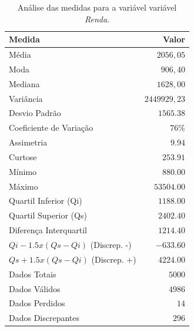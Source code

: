 \documentclass[10pt,a4paper,oneside]{article}
\begin{document}
\begin{table}[!h]
\centering
\caption{Análise das medidas para a variável variável \textit{Renda}.}
\vspace{0.5em}
\label{table:medidas-renda}
\begin{tabular}{l r}
	\toprule
	\textbf{Medida}               & \textbf{Valor} \\
	\midrule
	Média                         &  $2056,05$     \\
	Moda                          &  $906,40$      \\
	Mediana                       &  $1628,00$     \\
	Variância                     &  $2449929,23$  \\
	Desvio Padrão                 &  $1565.38$     \\
	Coeficiente de Variação       &  $76\%$        \\
	Assimetria                    &  $9.94$        \\
	Curtose                       &  $253.91$      \\
	Mínimo                        &  $880.00$      \\
	Máximo                        &  $53504.00$    \\
	Quartil Inferior (Qi)         &  $1188.00$     \\
	Quartil Superior (Qs)         &  $2402.40$     \\
	Diferença Interquartil        &  $1214.40$     \\
	$Qi-1.5x(Qs-Qi)$ (Discrep. -) &  $-633.60$     \\
	$Qs+1.5x(Qs-Qi)$ (Discrep. +) &  $4224.00$     \\
	Dados Totais                  &  $5000$        \\
	Dados Válidos                 &  $4986$        \\
	Dados Perdidos                &  $14$          \\
	Dados Discrepantes            &  $296$         \\
	\bottomrule
\end{tabular}
\end{table}
\end{document}
